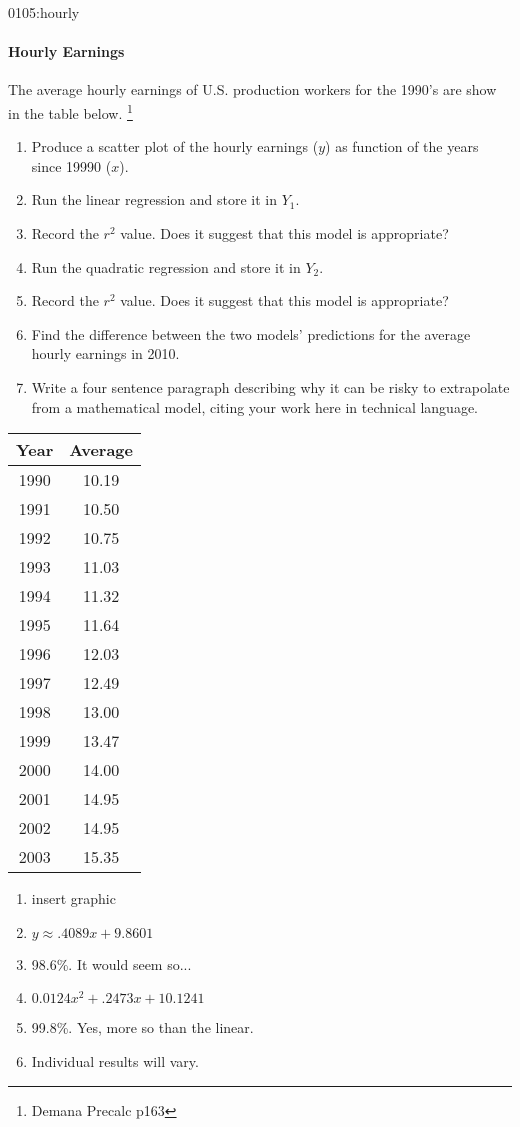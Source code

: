 \begin{defproblem}{0105:hourly}
\begin{onlyproblem}
\paragraph{Hourly Earnings}
The average hourly earnings of U.S. production
workers for the 1990's are show in the table below.
\footnote{Demana Precalc p163}
\begin{enumerate}
\item Produce a scatter plot of the hourly earnings ($y$) as function
of the years since 19990 ($x$).
\item Run the linear regression and store it in $Y_1$.
\item Record the $r^2$ value.  Does it suggest that this model is appropriate?
\item Run the quadratic regression and store it in $Y_2$.
\item Record the $r^2$ value.  Does it suggest that this model is appropriate?
\item Find the difference between the two models' predictions for the average hourly earnings in 2010.
\item Write a four sentence paragraph describing why it can be risky to extrapolate from a mathematical
model, citing your work here in technical language.
\end{enumerate}
\begin{tabular}{c|c}
	\textbf{Year} & \textbf{Average} \\ \hline
	1990 & 10.19\\
	1991 & 10.50\\
	1992 & 10.75\\
	1993 & 11.03\\
	1994 & 11.32\\
	1995 & 11.64\\
	1996 & 12.03\\
	1997 & 12.49\\
	1998 & 13.00\\
	1999 & 13.47\\
	2000 & 14.00\\
	2001 & 14.95\\
	2002 & 14.95\\
	2003 & 15.35\\
\end{tabular}
\end{onlyproblem}
\begin{onlysolution}
\begin{enumerate}
\item insert graphic
\item $y\approx.4089x+9.8601$
\item 98.6\%.  It would seem so...
\item $0.0124x^2+.2473x+10.1241$
\item 99.8\%.  Yes, more so than the linear.
\item Individual results will vary.
\end{enumerate}
\end{onlysolution}
\end{defproblem}




